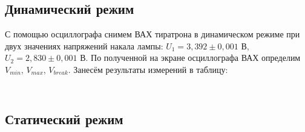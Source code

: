 \subsection{Динамический режим}
С помощью осциллографа снимем ВАХ тиратрона в динамическом режиме при двух
значениях напряжений накала лампы: $U_1 = 3,392 \pm 0,001$ В, $U_2 = 2,830\pm 0,001$ В.
По полученной на экране осциллографа ВАХ определим $V_{min}$, $V_{max}$, 
$V_{break}$. Занесём результаты измерений в таблицу:

\begin{table}[h!]
  \centering
  \caption{}
  \begin{tabular}{|c|}
    
  \end{tabular}
\end{table}

\subsection{Статический режим}